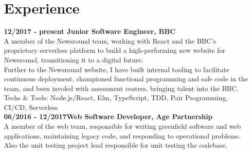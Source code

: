 \section{Experience}

\textbf{12/2017 - present \hspace{2.75em}Junior Software Engineer, BBC}\\

A member of the Newsround team, working with React and the BBC's proprietary serverless platform to build a high-performing new website for Newsround, transitioning it to a digital future.\\

Further to the Newsround website, I have built internal tooling to facilitate continuous deployment, championed functional programming and safe code in the team, and been involed with assessment centres, bringing talent into the BBC.\\

Techs \& Tools: Node.js/React, Elm, TypeScript, TDD, Pair Programming, CI/CD, Serverless\\

\textbf{06/2016 - 12/2017\hspace{2.75em}Web Software Developer, Age Partnership}\\

A member of the web team, responsible for writing greenfield software and web applications, maintaining legacy code, and responding to operational problems. Also the unit testing project lead responsible for unit testing the codebase.
